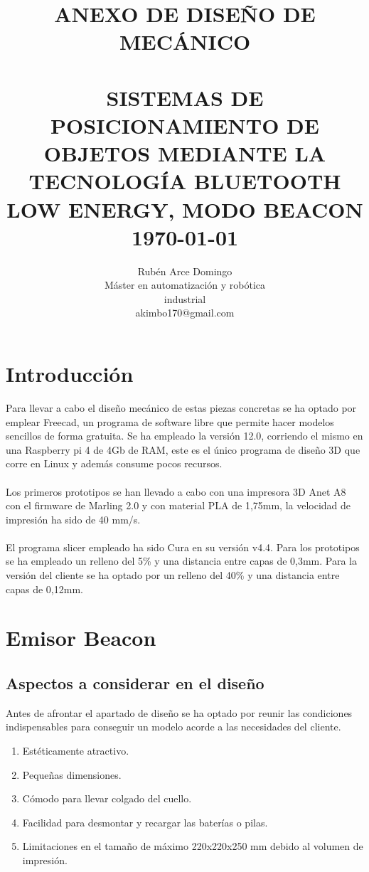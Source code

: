 \documentclass[paper=a4, fontsize=11pt,twoside]{scrartcl}
\title{	\normalsize \textsc{ANEXO DE DISEÑO DE MECÁNICO} 	%
		 	\\[2.0cm]								%
			\HRule{0.5pt} \\						%
			\LARGE \textbf{\uppercase{Sistemas de posicionamiento de objetos mediante la tecnología Bluetooth Low Energy, modo Beacon}}	%
			\HRule{2pt} \\ [0.5cm]		%
			\normalsize \today			%
		}
\author{
		Rubén Arce Domingo\\	
		Máster en automatización y robótica\\	
		industrial\\
		akimbo170@gmail.com\\
}
\makeatletter
\def\printtitle{%
    {\centering \@title\par}}
\def\printauthor{%
    {\centering \large \@author}}
\makeatother
\begin{document}
\thispagestyle{empty}		%
\printtitle					%
  	\vfill
\printauthor				%
\newpage
\cleardoublepage
\tableofcontents
\listoffigures
\cleardoublepage
\pagestyle{fancy}
\section{Introducción}
    Para llevar a cabo el diseño mecánico de estas piezas concretas se ha optado por emplear Freecad, un
    programa de software libre que permite hacer modelos sencillos de forma gratuita.
    Se ha empleado la versión 12.0, corriendo el mismo en una Raspberry pi 4 de 4Gb de RAM, este es el único
    programa de diseño 3D que corre en Linux  y además consume pocos recursos.
    \paragraph{}
    Los primeros prototipos se han llevado a cabo con una impresora 3D Anet A8 con el firmware de Marling
    2.0 y con material PLA de 1,75mm, la velocidad de impresión ha sido de 40 mm/s.
    \paragraph{}
    El programa slicer empleado ha sido Cura en su versión v4.4. Para los prototipos se ha empleado un relleno del 5\% y una distancia
    entre capas de 0,3mm. Para la versión del cliente se ha optado por un relleno del 40\% y una distancia entre capas de 0,12mm.
\section{Emisor Beacon}
    \subsection{Aspectos a considerar en el diseño}
        Antes de afrontar el apartado de diseño se ha optado por reunir las condiciones indispensables para 
        conseguir un modelo acorde a las necesidades del cliente.
        \begin{enumerate}
            \item Estéticamente atractivo.
            \item Pequeñas dimensiones.
            \item Cómodo para llevar colgado del cuello.
            \item Facilidad para desmontar y recargar las baterías o pilas.
            \item Limitaciones en el tamaño de máximo 220x220x250 mm debido al volumen de impresión.
        \end{enumerate}
\end{document}
